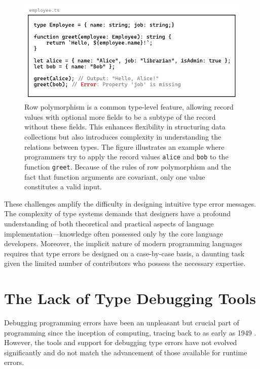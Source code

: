 \begin{figure}[htbp]
  \centering
  \includegraphics[width=\linewidth]{RowPolymorphism.pdf}
  \caption[An example of a correct usage and a wrong usage of row polymorphism in TypeScript]{
    \label{fig:row-polymophism}
Row polymorphism is a common type-level feature, allowing record values with optional more fields to be a subtype of the record without these fields. This enhances flexibility in structuring data collections but also introduces complexity in understanding the relations between types. The figure illustrates an example where programmers try to apply the record values \texttt{alice} and \texttt{bob} to the function \texttt{greet}. Because of the rules of row polymorphism and the fact that function arguments are covariant, only one value constitutes a valid input. 
    }
\end{figure}

These challenges amplify the difficulty in designing intuitive type error messages. The complexity of type systems demands that designers have a profound understanding of both theoretical and practical aspects of language implementation—knowledge often possessed only by the core language developers. Moreover, the implicit nature of modern programming languages requires that type errors be designed on a case-by-case basis, a daunting task given the limited number of contributors who possess the necessary expertise.

\section{The Lack of Type Debugging Tools}
\label{sec:debugging-tools}
Debugging programming errors have been an unpleasant but crucial part of programming since the inception of computing, tracing back to as early as 1949 \cite{Campbell-Kelly1992-rn}. However, the tools and support for debugging type errors have not evolved significantly and do not match the advancement of those available for runtime errors.

